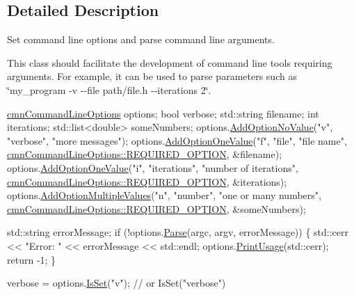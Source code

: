 \subsection{Detailed Description}
Set command line options and parse command line arguments. 

This class should facilitate the development of command line tools requiring arguments. For example, it can be used to parse parameters such as \char`\"{}my\-\_\-program -\/v -\/-\/file path/file.\-h -\/-\/iterations 2\char`\"{}.


\begin{DoxyCode}
\hyperlink{classcmn_command_line_options}{cmnCommandLineOptions} options;
\textcolor{keywordtype}{bool} verbose;
std::string filename;
\textcolor{keywordtype}{int} iterations;
std::list<double> someNumbers;
options.\hyperlink{classcmn_command_line_options_a7d8292a0b9cfcdc97591f55c41598ba5}{AddOptionNoValue}(\textcolor{stringliteral}{"v"}, \textcolor{stringliteral}{"verbose"}, \textcolor{stringliteral}{"more messages"});
options.\hyperlink{classcmn_command_line_options_af51a9e7df4d689c7de4daeebce7d313b}{AddOptionOneValue}(\textcolor{stringliteral}{"f"}, \textcolor{stringliteral}{"file"}, \textcolor{stringliteral}{"file name"}, 
      \hyperlink{classcmn_command_line_options_ac239a3ca62dd4e3b391824f6f1a97c76a18dad98cb48d91b0fe8ee13a54dc45ff}{cmnCommandLineOptions::REQUIRED\_OPTION}, &filename);
options.\hyperlink{classcmn_command_line_options_af51a9e7df4d689c7de4daeebce7d313b}{AddOptionOneValue}(\textcolor{stringliteral}{"i"}, \textcolor{stringliteral}{"iterations"}, \textcolor{stringliteral}{"number of iterations"}, 
      \hyperlink{classcmn_command_line_options_ac239a3ca62dd4e3b391824f6f1a97c76a18dad98cb48d91b0fe8ee13a54dc45ff}{cmnCommandLineOptions::REQUIRED\_OPTION}, &iterations);
options.\hyperlink{classcmn_command_line_options_ae8fa287fe01d51d1eb8fdda682b07f26}{AddOptionMultipleValues}(\textcolor{stringliteral}{"n"}, \textcolor{stringliteral}{"number"}, \textcolor{stringliteral}{"one or many numbers"}, 
      \hyperlink{classcmn_command_line_options_ac239a3ca62dd4e3b391824f6f1a97c76a18dad98cb48d91b0fe8ee13a54dc45ff}{cmnCommandLineOptions::REQUIRED\_OPTION}, &someNumbers);

std::string errorMessage;
\textcolor{keywordflow}{if} (!options.\hyperlink{classcmn_command_line_options_a7e6a6a950b408e0769ce9194d9cb65b5}{Parse}(argc, argv, errorMessage)) \{
    std::cerr << \textcolor{stringliteral}{"Error: "} << errorMessage << std::endl;
    options.\hyperlink{classcmn_command_line_options_a09d9261f50374d6178ab8865a16cad99}{PrintUsage}(std::cerr);
    \textcolor{keywordflow}{return} -1;
\}

verbose = options.\hyperlink{classcmn_command_line_options_aba78eaaa4cd80f68e5c64649bae98931}{IsSet}(\textcolor{stringliteral}{"v"}); \textcolor{comment}{// or IsSet("verbose")}
\end{DoxyCode}


